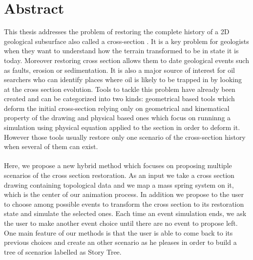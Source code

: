 \documentclass[12pt, a4paper]{report} %
\begin{document}



\chapter*{Abstract}

This thesis addresses the problem of restoring the complete history of a 2D geological 
subsurface also called a cross-section \cite{BalancedCrossSections}. It is a key problem for geologists when they want to understand how the terrain transformed to be in state it is today. Moreover restoring cross section allows them to date geological events such as faults, erosion or sedimentation. It is also a major source of interest for oil searchers who can identify places where oil is likely to be trapped in by looking at the cross section evolution. Tools to tackle this problem have already been created and can  be categorized into two kinds: geometrical based tools which deform the initial cross-section relying only on geometrical and kinematical property of the drawing and physical based ones which focus on runninng a simulation using physical equation applied to the section in order to deform it. However those tools usually restore only one scenario of the cross-section history when several of them can exist.\\\\
 Here, we propose a new hybrid method which focuses on proposing multiple scenarios of the cross section restoration. As an input we take a cross section drawing containing topological data and we map a mass spring system on it, which is the center of our animation process. In addition we propose to the user to choose among possible events to transform the cross section to its restoration state and simulate the selected ones. Each time an event simulation ends, we ask the user to make another event choice until there are no event to propose left. One main feature of our methods is that the user is able to come back to its previous choices and create an other scenario as he pleases in order to build a tree of scenarios labelled as Story Tree.\\\\

\tableofcontents
\end{document}
